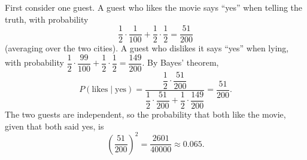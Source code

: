 First consider one guest. A guest who likes the movie says ``yes'' when telling the truth, with probability
\[
\dfrac{1}{2}\cdot\dfrac{1}{100}+\dfrac{1}{2}\cdot\dfrac{1}{2}=\dfrac{51}{200}
\]
(averaging over the two cities). A guest who dislikes it says ``yes'' when lying, with probability $\dfrac{1}{2}\cdot\dfrac{99}{100}+\dfrac{1}{2}\cdot\dfrac{1}{2}=\dfrac{149}{200}$. By Bayes' theorem,
\[
P(\text{likes}\mid\text{yes})=\dfrac{\dfrac{1}{2}\cdot\dfrac{51}{200}}{\dfrac{1}{2}\cdot\dfrac{51}{200}+\dfrac{1}{2}\cdot\dfrac{149}{200}}=\dfrac{51}{200}.
\]
The two guests are independent, so the probability that both like the movie, given that both said yes, is
\[
\left(\dfrac{51}{200}\right)^2=\boxed{\dfrac{2601}{40000}}\approx0.065 .
\]
